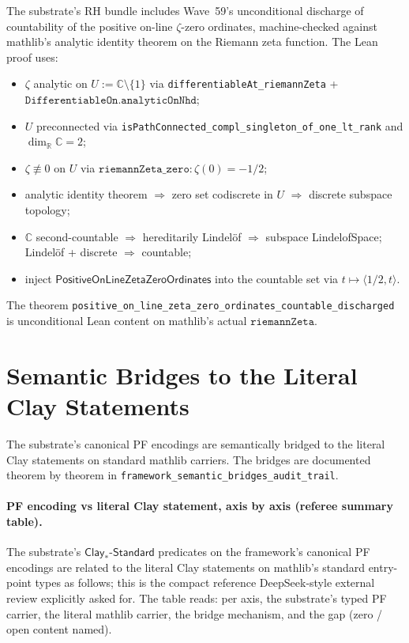 \documentclass[11pt,a4paper]{amsart}
\theoremstyle{plain}
\theoremstyle{definition}
\begin{document}
The substrate's RH bundle includes Wave~59's unconditional discharge of countability of the positive on-line $\zeta$-zero ordinates, machine-checked against mathlib's analytic identity theorem on the Riemann zeta function. The Lean proof uses:
\begin{itemize}[itemsep=2pt]
\item $\zeta$ analytic on $U := \mathbb{C}\setminus\{1\}$ via \texttt{differentiableAt\_riemannZeta} + $\texttt{DifferentiableOn.analyticOnNhd}$;
\item $U$ preconnected via \texttt{isPathConnected\_compl\_singleton\_of\_one\_lt\_rank} and $\dim_{\mathbb{R}}\mathbb{C} = 2$;
\item $\zeta \not\equiv 0$ on $U$ via $\texttt{riemannZeta\_zero} : \zeta(0) = -1/2$;
\item analytic identity theorem $\Rightarrow$ zero set codiscrete in $U$ $\Rightarrow$ discrete subspace topology;
\item $\mathbb{C}$ second-countable $\Rightarrow$ hereditarily Lindel\"of $\Rightarrow$ subspace LindelofSpace; Lindel\"of + discrete $\Rightarrow$ countable;
\item inject $\textsf{PositiveOnLineZetaZeroOrdinates}$ into the countable set via $t \mapsto \langle 1/2, t\rangle$.
\end{itemize}
The theorem \texttt{positive\_on\_line\_zeta\_zero\_ordinates\_countable\_discharged} is unconditional Lean content on mathlib's actual $\texttt{riemannZeta}$.

\section{Semantic Bridges to the Literal Clay Statements}\label{sec:bridges}

The substrate's canonical PF encodings are semantically bridged to the literal Clay statements on standard mathlib carriers. The bridges are documented theorem by theorem in \texttt{framework\_semantic\_bridges\_audit\_trail}.

\paragraph{PF encoding vs literal Clay statement, axis by axis (referee summary table).} The substrate's $\textsf{Clay}_{*}\textsf{-Standard}$ predicates on the framework's canonical PF encodings are related to the literal Clay statements on mathlib's standard entry-point types as follows; this is the compact reference DeepSeek-style external review explicitly asked for. The table reads: per axis, the substrate's typed PF carrier, the literal mathlib carrier, the bridge mechanism, and the gap (zero / open content named).
\end{document}
